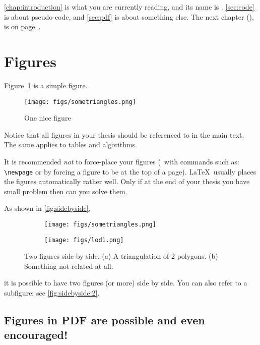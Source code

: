 \autoref{chap:introduction} is what you are currently reading, and its name is .
\autoref{sec:code} is about pseudo-code, and \autoref{sec:pdf} is about something else.
The next chapter (), is on page~\pageref{chap:rw}.


%
\section{Figures}%
\label{sec:figures}

Figure~\ref{fig:sometriangles} is a simple figure.
\begin{figure}
  \centering
  \texttt{[image: figs/sometriangles.png]}
  \caption{One nice figure}%
\label{fig:sometriangles}
\end{figure}
Notice that all figures in your thesis should be referenced to in the main text.
The same applies to tables and algorithms.

It is recommended \emph{not} to force-place your figures (\eg\ with commands such as: \texttt{\textbackslash{}newpage} or by forcing a figure to be at the top of a page).
\LaTeX\ usually places the figures automatically rather well.
Only if at the end of your thesis you have small problem then can you solve them.

As shown in \autoref{fig:sidebyside},
\begin{figure}
  \centering
  \begin{subfigure}[b]{0.3\linewidth}
    \centering
    \texttt{[image: figs/sometriangles.png]}
    \caption{}\label{fig:sidebyside:1}
  \end{subfigure}%
  \qquad %
  \begin{subfigure}[b]{0.6\linewidth}
    \centering
    \texttt{[image: figs/lod1.png]}
    \caption{}\label{fig:sidebyside:2}
  \end{subfigure}%
  \caption[Shortened title for the list of figures]{Two figures side-by-side. (a) A triangulation of 2 polygons. (b) Something not related at all.}%
\label{fig:sidebyside}
\end{figure}
it is possible to have two figures (or more) side by side.
You can also refer to a subfigure: see \autoref{fig:sidebyside:2}.


\subsection[Shorter section name for the TOC]{Figures in PDF are possible and even encouraged!}%
\label{sec:pdf}

